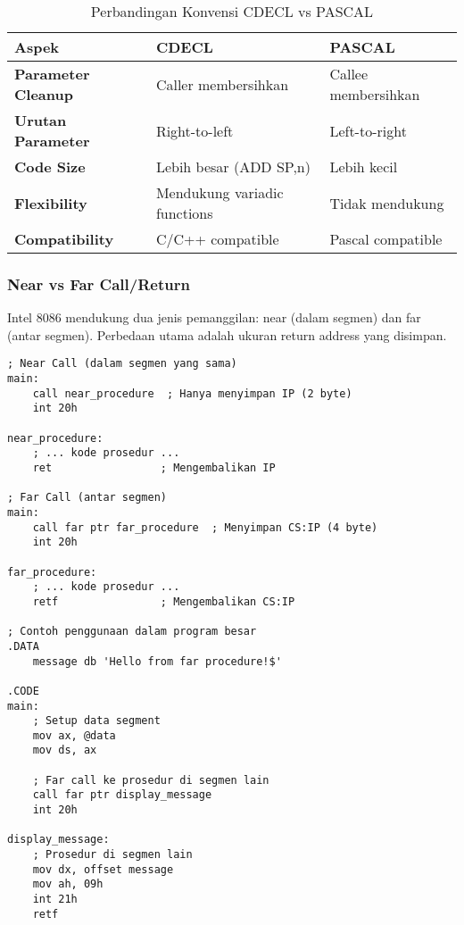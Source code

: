 \documentclass[../main.tex]{subfiles}
\begin{document}
                \begin{table}[H]
                    \centering
                    \caption{Perbandingan Konvensi CDECL vs PASCAL}
                    \begin{tabular}{|p{2.5cm}|p{6cm}|p{6cm}|}
                        \hline
                        \textbf{Aspek} & \textbf{CDECL} & \textbf{PASCAL} \\
                        \hline
                        \textbf{Parameter Cleanup} & Caller membersihkan & Callee membersihkan \\
                        \hline
                        \textbf{Urutan Parameter} & Right-to-left & Left-to-right \\
                        \hline
                        \textbf{Code Size} & Lebih besar (ADD SP,n) & Lebih kecil \\
                        \hline
                        \textbf{Flexibility} & Mendukung variadic functions & Tidak mendukung \\
                        \hline
                        \textbf{Compatibility} & C/C++ compatible & Pascal compatible \\
                        \hline
                    \end{tabular}
                    \label{tab:cdecl-pascal-comparison}
                \end{table}

            \subsubsection{Near vs Far Call/Return}
                Intel 8086 mendukung dua jenis pemanggilan: near (dalam segmen) dan far (antar segmen). Perbedaan utama adalah ukuran return address yang disimpan.

                \begin{lstlisting}[language={[x86masm]Assembler}, caption=Near vs Far Call, label={lst:near-far-call}]
; Near Call (dalam segmen yang sama)
main:
    call near_procedure  ; Hanya menyimpan IP (2 byte)
    int 20h

near_procedure:
    ; ... kode prosedur ...
    ret                 ; Mengembalikan IP

; Far Call (antar segmen)
main:
    call far ptr far_procedure  ; Menyimpan CS:IP (4 byte)
    int 20h

far_procedure:
    ; ... kode prosedur ...
    retf                ; Mengembalikan CS:IP

; Contoh penggunaan dalam program besar
.DATA
    message db 'Hello from far procedure!$'

.CODE
main:
    ; Setup data segment
    mov ax, @data
    mov ds, ax
    
    ; Far call ke prosedur di segmen lain
    call far ptr display_message
    int 20h

display_message:
    ; Prosedur di segmen lain
    mov dx, offset message
    mov ah, 09h
    int 21h
    retf
                \end{lstlisting}
\end{document}
